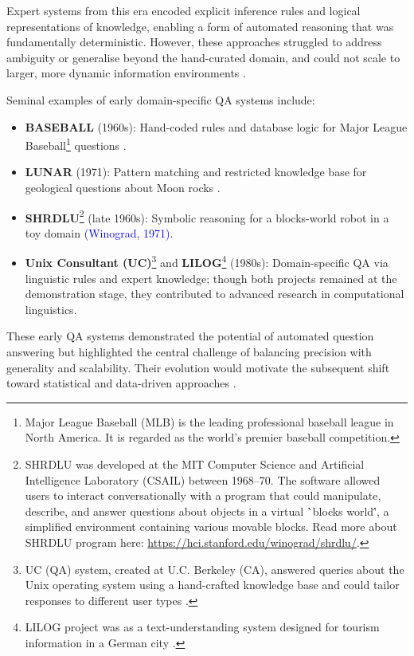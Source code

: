 \begin{spacing}{1.5}
Expert systems from this era encoded explicit inference rules and logical representations of knowledge, enabling a form of automated reasoning that was fundamentally deterministic. However, these approaches struggled to address ambiguity or generalise beyond the hand-curated domain, and could not scale to larger, more dynamic information environments \citep{noauthor_question_2025, jurafsky_chapter_2024}.

Seminal examples of early domain-specific QA systems include:
\begin{itemize}
    \item \textbf{BASEBALL} (1960s): Hand-coded rules and database logic for Major League Baseball\footnote{Major League Baseball (MLB) is the leading professional baseball league in North America. It is regarded as the world’s premier baseball competition.} questions \citep{green_baseball_1961}.
    \item \textbf{LUNAR} (1971): Pattern matching and restricted knowledge base for geological questions about Moon rocks \citep{woods_lunar_1972}.
    \item \textbf{SHRDLU}\footnote{SHRDLU was developed at the MIT Computer Science and Artificial Intelligence Laboratory (CSAIL) between 1968--70. The software allowed users to interact conversationally with a program that could manipulate, describe, and answer questions about objects in a virtual \``blocks world\'', a simplified environment containing various movable blocks. Read more about SHRDLU program here: \url{https://hci.stanford.edu/winograd/shrdlu/}.} (late 1960s): Symbolic reasoning for a blocks-world robot in a toy domain \textcolor{blue}{(Winograd, 1971)}.
    \item \textbf{Unix Consultant (UC)}\footnote{UC (QA) system, created at U.C. Berkeley (CA), answered queries about the Unix operating system using a hand-crafted knowledge base and could tailor responses to different user types \citep{robert_berkeley_1988}.}  and \textbf{LILOG}\footnote{LILOG project was as a text-understanding system designed for tourism information in a German city \citep{noauthor_question_2025}.} (1980s): Domain-specific QA via linguistic rules and expert knowledge; though both projects remained at the demonstration stage, they contributed to advanced research in computational linguistics.
\end{itemize}

These early QA systems demonstrated the potential of automated question answering but highlighted the central challenge of balancing precision with generality and scalability. Their evolution would motivate the subsequent shift toward statistical and data-driven approaches \citep{jurafsky_chapter_2024, antoniou_survey_2022}.


\end{spacing}
